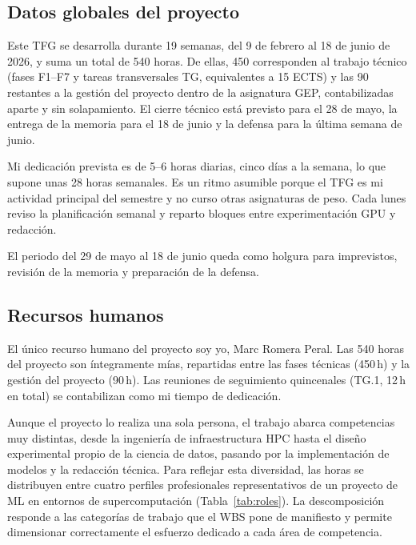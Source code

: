 \subsection{Datos globales del proyecto}

Este TFG se desarrolla durante 19 semanas, del 9 de febrero al 18 de junio de 2026, y suma un total de 540 horas. De ellas, 450 corresponden al trabajo técnico (fases F1--F7 y tareas transversales TG, equivalentes a 15 ECTS) y las 90 restantes a la gestión del proyecto dentro de la asignatura GEP, contabilizadas aparte y sin solapamiento. El cierre técnico está previsto para el 28 de mayo, la entrega de la memoria para el 18 de junio y la defensa para la última semana de junio.

Mi dedicación prevista es de 5--6 horas diarias, cinco días a la semana, lo que supone unas 28 horas semanales. Es un ritmo asumible porque el TFG es mi actividad principal del semestre y no curso otras asignaturas de peso. Cada lunes reviso la planificación semanal y reparto bloques entre experimentación GPU y redacción.

El periodo del 29 de mayo al 18 de junio queda como holgura para imprevistos, revisión de la memoria y preparación de la defensa.

\subsection{Recursos humanos}

El único recurso humano del proyecto soy yo, Marc Romera Peral. Las 540 horas del proyecto son íntegramente mías, repartidas entre las fases técnicas (450\,h) y la gestión del proyecto (90\,h). Las reuniones de seguimiento quincenales (TG.1, 12\,h en total) se contabilizan como mi tiempo de dedicación.

Aunque el proyecto lo realiza una sola persona, el trabajo abarca competencias muy distintas, desde la ingeniería de infraestructura HPC hasta el diseño experimental propio de la ciencia de datos, pasando por la implementación de modelos y la redacción técnica. Para reflejar esta diversidad, las horas se distribuyen entre cuatro perfiles profesionales representativos de un proyecto de ML en entornos de supercomputación (Tabla~\ref{tab:roles}). La descomposición responde a las categorías de trabajo que el WBS pone de manifiesto y permite dimensionar correctamente el esfuerzo dedicado a cada área de competencia.

